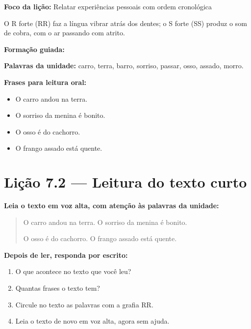 \textbf{Foco da lição:} Relatar experiências pessoais com ordem cronológica


\begin{boquinha}
O R forte (RR) faz a língua vibrar atrás dos dentes; o S forte (SS) produz o som de cobra, com o ar passando com atrito.
\end{boquinha}

\noindent\textbf{Formação guiada:}

\begin{center}
\end{center}

\noindent\textbf{Palavras da unidade:} carro, terra, barro, sorriso, passar, osso, assado, morro.

\noindent\textbf{Frases para leitura oral:}
\begin{itemize}[leftmargin=1.6em]
  \item O carro andou na terra.
  \item O sorriso da menina é bonito.
  \item O osso é do cachorro.
  \item O frango assado está quente.
\end{itemize}

\section{Lição 7.2 --- Leitura do texto curto}

\noindent\textbf{Leia o texto em voz alta, com atenção às palavras da unidade:}


\begin{quote}
O carro andou na terra. O sorriso da menina é bonito.

O osso é do cachorro. O frango assado está quente.
\end{quote}

\textbf{Depois de ler, responda por escrito:}
\begin{enumerate}

  \item O que acontece no texto que você leu?
  \begin{center}
  \underline{\hspace{12cm}}
  \end{center}

  \item Quantas frases o texto tem?
  \begin{center}
  \underline{\hspace{12cm}}
  \end{center}

  \item Circule no texto as palavras com a grafia RR.

  \item Leia o texto de novo em voz alta, agora sem ajuda.

\end{enumerate}

